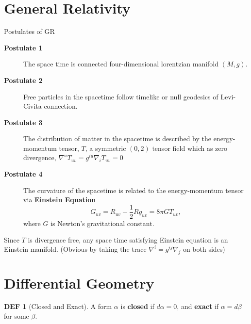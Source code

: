 \documentclass[twocolumn]{article}
\renewcommand{\emph}[1]{{\color{blue!70!black}\sffamily\bfseries #1}}
\newcommand{\n}{\nabla}
\theoremstyle{definition}
\newtheorem{defi}[thm]{DEF}
\begin{document}
\section{General Relativity}
\begin{fthm}{Postulates of GR}{}
	\begin{description}
		\item[\textbf{Postulate 1}] The space time is connected four-dimensional lorentzian manifold $(M, g)$.
		\item[\textbf{Postulate 2}] Free particles in the spacetime follow timelike or null geodesics of Levi-Civita connection.
		\item[\textbf{Postulate 3}] The distribution of matter in the spacetime is described by the energy-momentum tensor, $T$, a symmetric $(0,2)$ tensor field which as zero divergence, $\n^u T_{uv} = g^{iu} \n_i T_{uv}= 0$
		\item[\textbf{Postulate 4}] The curvature of the spacetime is related to the energy-momentum tensor via \emph{Einstein Equation}
			$$
			G_{uv} = R_{uv} - \frac{1}{2}R g_{uv} = 8\pi G T_{uv},
			$$
		where $G$ is Newton's gravitational constant.
	\end{description}
	Since $T$ is divergence free, any space time satisfying Einstein equation is an Einstein manifold. 
	(Obvious by taking the trace $\n^i = g^{ij} \n_j$ on both sides)
\end{fthm}

\section{Differential Geometry}

\begin{defi}[Closed and Exact]
	A form $\alpha$ is \emph{closed} if $d \alpha = 0$, and \emph{exact} if $\alpha = d \beta$ for some $\beta$.
\end{defi}
\end{document}
